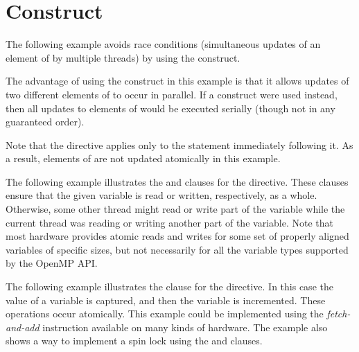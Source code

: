 \section{ Construct}
\label{sec:atomic}

The following example avoids race conditions (simultaneous updates of an element 
of  by multiple threads) by using the  construct.

The advantage of using the  construct in this example is that it 
allows updates of two different elements of  to occur in parallel. If 
a  construct were used instead, then all updates to elements of 
 would be executed serially (though not in any guaranteed order).

Note that the  directive applies only to the statement immediately 
following it. As a result, elements of  are not updated atomically in 
this example.



The following example illustrates the  and   clauses 
for the  directive. These clauses ensure that the given variable 
is read or written, respectively, as a whole. Otherwise, some other thread might 
read or write part of the variable while the current thread was reading or writing 
another part of the variable. Note that most hardware provides atomic reads and 
writes for some set of properly aligned variables of specific sizes, but not necessarily 
for all the variable types supported by the OpenMP API.



The following example illustrates the  clause for the  
directive. In this case the value of a variable is captured, and then the variable 
is incremented. These operations occur atomically. This example could 
be implemented using the \emph{fetch-and-add} instruction available on many kinds of hardware.
The example also shows a way to implement a spin lock using the  
 and  clauses.




